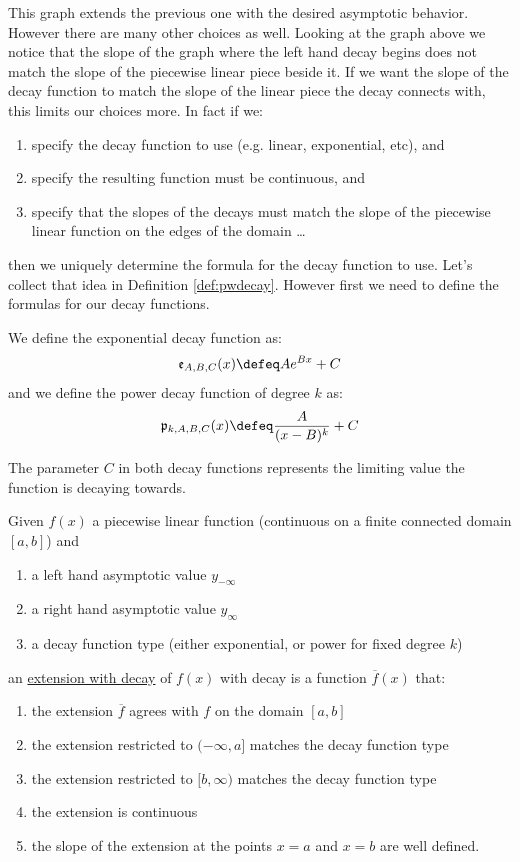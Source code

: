 \documentclass[10pt]{article}
\begin{document}
This graph extends the previous one with the desired asymptotic behavior.
However there are many other choices as well.  Looking at the graph above
we notice that the slope of the graph where the left hand decay begins does
not match the slope of the piecewise linear piece beside it.  If we want
the slope of the decay function to match the slope of the linear piece the
decay connects with, this limits our choices more.  In fact if we:
\begin{enumerate}
\item specify the decay function to use (e.g. linear, exponential, etc), and
\item specify the resulting function must be continuous, and
\item specify that the slopes of the decays must match the slope of the piecewise linear
function on the edges of the domain \ldots
\end{enumerate}
then we uniquely determine the formula for the decay function to use.  Let's
collect that idea in Definition \ref{def:pwdecay}.  However first we need to
define the formulas for our decay functions.
\begin{definition}
We define the exponential decay function as:
$$\mathfrak{e}_{A,B,C}(x) \defeq Ae^{Bx}+C$$
and we define the power decay function of degree $k$ as:
$$\mathfrak{p}_{k,A,B,C}(x) \defeq \frac{A}{(x-B)^k}+C$$
\end{definition}
\begin{note}
The parameter $C$ in both decay functions represents the limiting value
the function is decaying towards.
\end{note}
\begin{definition}
\label{def:pwdecay}
Given $f(x)$ a piecewise linear function (continuous on a finite connected domain $[a,b]$) and
\begin{enumerate}
\item a left hand asymptotic value $y_{-\infty}$
\item a right hand asymptotic value $y_{\infty}$
\item a decay function type (either exponential, or power for fixed degree $k$)
\end{enumerate}
an \ul{extension with decay} of $f(x)$ with decay is a function $\overline{f}(x)$ that:
\begin{enumerate}
\item the extension $\overline{f}$ agrees with $f$ on the domain $[a,b]$
\item the extension restricted to $(-\infty, a]$ matches the decay function type
\item the extension restricted to $[b, \infty)$ matches the decay function type
\item the extension is continuous
\item the slope of the extension at the points $x=a$ and $x=b$ are well defined.
\end{enumerate}
\end{definition}
\end{document}
